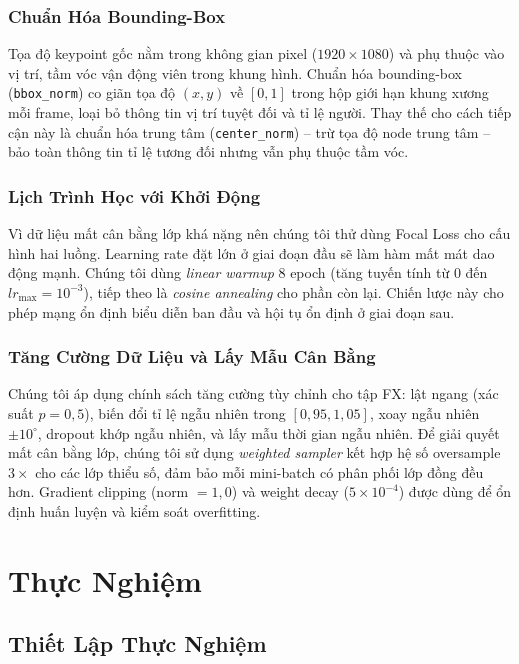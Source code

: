 \documentclass[conference]{IEEEtran}
\begin{document}
\subsubsection{Chuẩn Hóa Bounding-Box}
Tọa độ keypoint gốc nằm trong không gian pixel ($1920 \times 1080$) và
phụ thuộc vào vị trí, tầm vóc vận động viên trong khung hình. Chuẩn
hóa bounding-box (\texttt{bbox\_norm}) co giãn tọa độ $(x,y)$ về
$[0,1]$ trong hộp giới hạn khung xương mỗi frame, loại bỏ thông tin
vị trí tuyệt đối và tỉ lệ người. Thay thế cho cách tiếp cận này là
chuẩn hóa trung tâm (\texttt{center\_norm}) -- trừ tọa độ node trung
tâm -- bảo toàn thông tin tỉ lệ tương đối nhưng vẫn phụ thuộc tầm vóc.

\subsubsection{Lịch Trình Học với Khởi Động}
Vì dữ liệu mất cân bằng lớp khá nặng nên chúng tôi thử dùng Focal Loss cho cấu hình hai luồng. Learning rate
đặt lớn ở giai đoạn đầu sẽ làm hàm mất mát dao động mạnh. Chúng tôi dùng \textit{linear
warmup} 8 epoch (tăng tuyến tính từ $0$ đến $lr_{\max} = 10^{-3}$),
tiếp theo là \textit{cosine annealing} cho phần còn lại. Chiến lược này
cho phép mạng ổn định biểu diễn ban đầu và hội tụ ổn định ở giai đoạn sau.

\subsubsection{Tăng Cường Dữ Liệu và Lấy Mẫu Cân Bằng}
Chúng tôi áp dụng chính sách tăng cường tùy chỉnh cho tập FX: lật ngang
(xác suất $p=0{,}5$), biến đổi tỉ lệ ngẫu nhiên trong $[0{,}95, 1{,}05]$,
xoay ngẫu nhiên $\pm 10^\circ$, dropout khớp ngẫu nhiên, và lấy mẫu thời
gian ngẫu nhiên. Để giải quyết mất cân bằng lớp, chúng tôi sử dụng
\textit{weighted sampler} kết hợp hệ số oversample $3\times$ cho các
lớp thiểu số, đảm bảo mỗi mini-batch có phân phối lớp đồng đều hơn.
Gradient clipping (norm $= 1{,}0$) và weight decay ($5 \times 10^{-4}$)
được dùng để ổn định huấn luyện và kiểm soát overfitting.

\section{Thực Nghiệm}
\label{sec:exp}

\subsection{Thiết Lập Thực Nghiệm}
\end{document}
